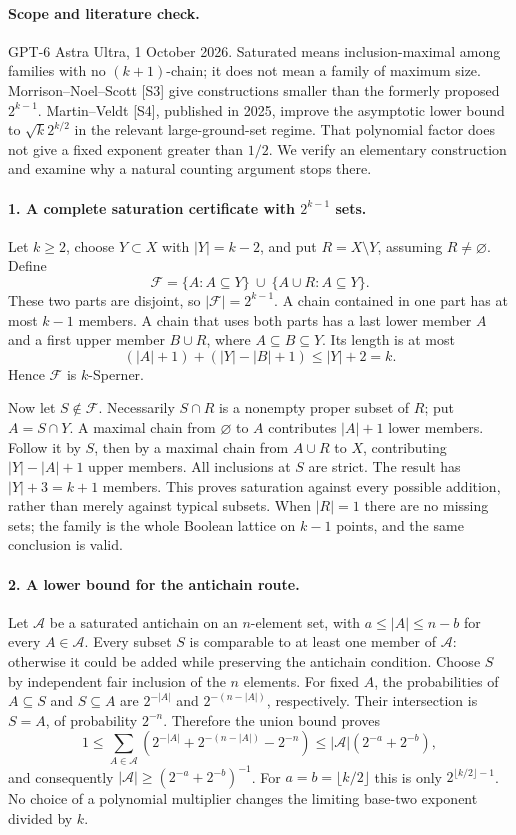 \documentclass[11pt,a4paper]{article}
\begin{document}
\paragraph{Scope and literature check.}
GPT-6 Astra Ultra, 1 October 2026. Saturated means inclusion-maximal
among families with no $(k+1)$-chain; it does not mean a family of
maximum size. Morrison--Noel--Scott [S3] give constructions smaller
than the formerly proposed $2^{k-1}$. Martin--Veldt [S4], published
in 2025, improve the asymptotic lower bound to $\sqrt{k}2^{k/2}$
in the relevant large-ground-set regime. That polynomial factor does
not give a fixed exponent greater than $1/2$. We verify an elementary
construction and examine why a natural counting argument stops there.

\paragraph{1. A complete saturation certificate with $2^{k-1}$ sets.}
Let $k\ge2$, choose $Y\subset X$ with $|Y|=k-2$, and put
$R=X\setminus Y$, assuming $R\ne\varnothing$. Define
\[
 \mathcal F=\{A:A\subseteq Y\}\ \cup\
 \{A\cup R:A\subseteq Y\}.
\]
These two parts are disjoint, so $|\mathcal F|=2^{k-1}$.
A chain contained in one part has at most $k-1$ members. A chain
that uses both parts has a last lower member $A$ and a first upper
member $B\cup R$, where $A\subseteq B\subseteq Y$. Its length is at most
\[
 (|A|+1)+(|Y|-|B|+1)\le |Y|+2=k.
\]
Hence $\mathcal F$ is $k$-Sperner.

Now let $S\notin\mathcal F$. Necessarily $S\cap R$ is a nonempty
proper subset of $R$; put $A=S\cap Y$. A maximal chain from
$\varnothing$ to $A$ contributes $|A|+1$ lower members. Follow it
by $S$, then by a maximal chain from $A\cup R$ to $X$, contributing
$|Y|-|A|+1$ upper members. All inclusions at $S$ are strict. The
result has $|Y|+3=k+1$ members. This proves saturation against
every possible addition, rather than merely against typical subsets.
When $|R|=1$ there are no missing sets; the family is the whole
Boolean lattice on $k-1$ points, and the same conclusion is valid.

\paragraph{2. A lower bound for the antichain route.}
Let $\mathcal A$ be a saturated antichain on an $n$-element set,
with $a\le|A|\le n-b$ for every $A\in\mathcal A$. Every subset
$S$ is comparable to at least one member of $\mathcal A$: otherwise
it could be added while preserving the antichain condition.
Choose $S$ by independent fair inclusion of the $n$ elements. For
fixed $A$, the probabilities of $A\subseteq S$ and $S\subseteq A$
are $2^{-|A|}$ and $2^{-(n-|A|)}$, respectively. Their intersection
is $S=A$, of probability $2^{-n}$. Therefore the union bound proves
\[
 1\le\sum_{A\in\mathcal A}
 \left(2^{-|A|}+2^{-(n-|A|)}-2^{-n}\right)
 \le|\mathcal A|(2^{-a}+2^{-b}),
\]
and consequently $|\mathcal A|\ge(2^{-a}+2^{-b})^{-1}$.
For $a=b=\lfloor k/2\rfloor$ this is only
$2^{\lfloor k/2\rfloor-1}$. No choice of a polynomial multiplier
changes the limiting base-two exponent divided by $k$.
\end{document}
